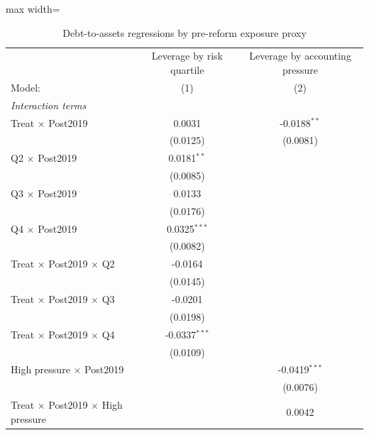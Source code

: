 \begin{table}[htbp]
   \caption{\label{tab:appendix_robustness_firm_heterogeneity} Debt-to-assets regressions by pre-reform exposure proxy}
   \centering
   \fontsize{6.5pt}{7.3pt}\selectfont
   \begin{adjustbox}{max width=\textwidth}
   \begin{tabular}{lcc}
      \toprule
                                  & Leverage by risk quartile & Leverage by accounting pressure \\
      Model:                      & (1)                         & (2) \\
      \midrule
      \multicolumn{3}{l}{\textit{Interaction terms}} \\
      Treat $\times$ Post2019     & 0.0031                      & -0.0188$^{**}$ \\
                                  & (0.0125)                    & (0.0081) \\
      Q2 $\times$ Post2019        & 0.0181$^{**}$               &  \\
                                  & (0.0085)                    &  \\
      Q3 $\times$ Post2019        & 0.0133                      &  \\
                                  & (0.0176)                    &  \\
      Q4 $\times$ Post2019        & 0.0325$^{***}$              &  \\
                                  & (0.0082)                    &  \\
      Treat $\times$ Post2019 $\times$ Q2 & -0.0164            &  \\
                                  & (0.0145)                    &  \\
      Treat $\times$ Post2019 $\times$ Q3 & -0.0201            &  \\
                                  & (0.0198)                    &  \\
      Treat $\times$ Post2019 $\times$ Q4 & -0.0337$^{***}$    &  \\
                                  & (0.0109)                    &  \\
      High pressure $\times$ Post2019 &                             & -0.0419$^{***}$ \\
                                  &                             & (0.0076) \\
      Treat $\times$ Post2019 $\times$ High pressure &             & 0.0042 \\

\end{tabular}
\end{adjustbox}
\end{table}

